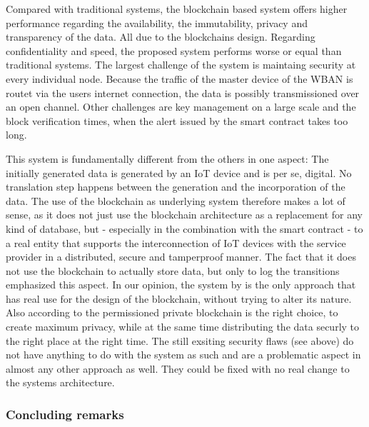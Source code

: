 Compared with traditional systems, the blockchain based system offers higher performance regarding the availability, the immutability, privacy and transparency of the data. All due to the blockchains design. Regarding confidentiality and speed, the proposed system performs worse or equal than traditional systems.
The largest challenge of the system is maintaing security at every individual node. Because the traffic of the master device of the WBAN is routet via the users internet connection, the data is possibly transmissioned over an open channel.  Other challenges are key management on a large scale and the block verification times, when the alert issued by the smart contract takes too long.

This system is fundamentally different from the others in one aspect: The initially generated data is generated by an IoT device and is per se, digital. No translation step happens between the generation and the incorporation of the data.
The use of the blockchain as underlying system therefore makes a lot of sense, as it does not just use the blockchain architecture as a replacement for any kind of database, but - especially in the combination with the smart contract - to a real entity that supports the interconnection of IoT devices with the service provider in a distributed, secure and tamperproof manner. The fact that it does not use the blockchain to actually store data, but only to log the transitions emphasized this aspect.
In our opinion, the system by  \citeauthor{Baccarini2018} is the only approach that has real use for the design of the blockchain, without trying to alter its nature. Also according to \citeauthor{Wust2017} the permissioned private blockchain is the right choice, to create maximum privacy, while at the same time distributing the data securly to the right place at the right time.
The still exsiting security flaws (see above) do not have anything to do with the system as such and are a problematic aspect in almost any other approach as well. They could be fixed with no real change to the systems architecture. 

\subsubsection{Concluding remarks}

